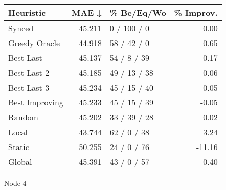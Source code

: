 \begin{tabular}{lrlr}
\toprule
\textbf{Heuristic} & \textbf{MAE ↓} & \textbf{\% Be/Eq/Wo} & \textbf{\% Improv.} \\
\midrule
            Synced &         45.211 &          0 / 100 / 0 &                0.00 \\
     Greedy Oracle &         44.918 &          58 / 42 / 0 &                0.65 \\
         Best Last &         45.137 &          54 / 8 / 39 &                0.17 \\
       Best Last 2 &         45.185 &         49 / 13 / 38 &                0.06 \\
       Best Last 3 &         45.234 &         45 / 15 / 40 &               -0.05 \\
    Best Improving &         45.233 &         45 / 15 / 39 &               -0.05 \\
            Random &         45.202 &         33 / 39 / 28 &                0.02 \\
             Local &         43.744 &          62 / 0 / 38 &                3.24 \\
            Static &         50.255 &          24 / 0 / 76 &              -11.16 \\
            Global &         45.391 &          43 / 0 / 57 &               -0.40 \\
\bottomrule
\end{tabular}
\caption{Node 4}
\label{tab:non_lr01_le1_bs4_4}
